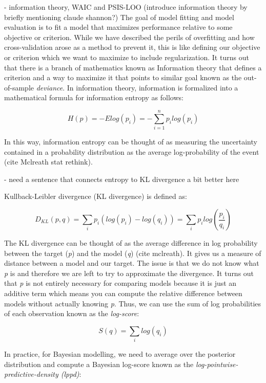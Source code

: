 - information theory, WAIC and PSIS-LOO
(introduce information theory by briefly mentioning claude shannon?)
The goal of model fitting and model evaluation is to fit a model that maximizes performance relative to some objective or criterion. While we have described the perils of overfitting and how cross-validation arose as a method to prevent it, this is like defining our objective or criterion which we want to maximize to include regularization. It turns out that there is a branch of mathematics known as Information theory that defines a criterion and a way to maximize it that points to similar goal known as the out-of-sample \textit{deviance}. In information theory, information is formalized into a mathematical formula for information entropy as follows:

\begin{equation}
H(p) = -Elog(p_i) = - \sum_{i=1}^{n} p_i log(p_i)
\end{equation}

In this way, information entropy can be thought of as measuring the uncertainty contained in a probability distribution as the average log-probability of the event (cite Mclreath stat rethink).

- need a sentence that connects entropy to KL divergence a bit better here

Kullback-Leibler divergence (KL divergence) is defined as:

\begin{equation}
D_{KL}(p,q) = \sum_{i} p_i (log(p_i) - log(q_i)) = \sum_{i} p_i log \left(\frac{p_i}{q_i} \right)
\end{equation}

The KL divergence can be thought of as the average difference in log probability between the target (\textit{p}) and the model (\textit{q}) (cite mclreath). It gives us a measure of distance between a model and our target. The issue is that we do not know what \textit{p} is and therefore we are left to try to approximate the divergence. It turns out that \textit{p} is not entirely necessary for comparing models because it is just an additive term which means you can compute the relative difference between models without actually knowing \textit{p}. Thus, we can use the sum of log probabilities of each observation known as the \textit{log-score}:

\begin{equation}
S(q) = \sum_i log(q_i)
\end{equation}

In practice, for Bayesian modelling, we need to average over the posterior distribution and compute a Bayesian log-score known as the \textit{log-pointwise-predictive-density (lppd)}:

